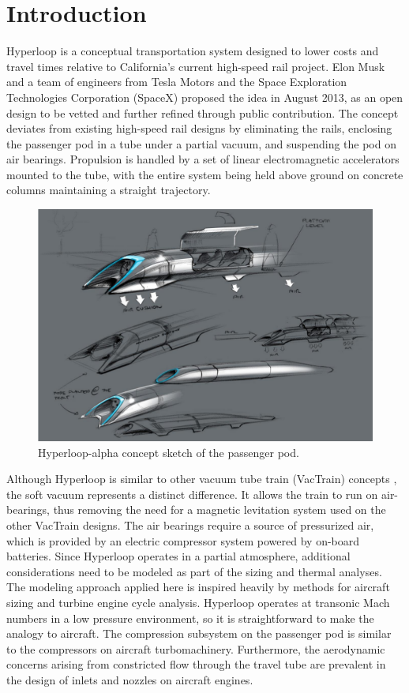 \documentclass[heading.tex]{subfiles}
\begin{document}
\section{Introduction}

Hyperloop is a conceptual transportation system designed to lower costs and travel times relative to California's current high-speed rail project.
\cite{Musk} Elon Musk and a team of engineers from Tesla Motors and the Space Exploration Technologies Corporation (SpaceX)
proposed the idea in August 2013, as an open design to be vetted and further refined through public contribution.
The concept deviates from existing high-speed rail designs by eliminating the rails, enclosing the passenger pod in a 
tube under a partial vacuum, and suspending the pod on air bearings. Propulsion is handled by a set of linear 
electromagnetic accelerators mounted to the tube, with the entire system being held above ground on concrete 
columns maintaining a straight trajectory.

\begin{figure}[hbtp]
\centering
\includegraphics[width=.75\textwidth]{images/hyperloopAlphaSketch.png}
 \caption[Hyperloop Concept Sketch]{Hyperloop-alpha concept sketch of the passenger pod. \cite{Musk}}
\label{f:hyperloopSketch}
\end{figure}

Although Hyperloop is similar to other vacuum tube train (VacTrain) concepts \cite{ET3}, the soft vacuum represents a distinct difference.
It allows the train to run on air-bearings, thus removing the need for a magnetic levitation system used on the other VacTrain designs.
The air bearings require a source of pressurized air, which is provided by an electric compressor system powered by on-board batteries.
Since Hyperloop operates in a partial atmosphere, additional considerations need to be modeled as part of the sizing and thermal analyses. 
The modeling approach applied here is inspired heavily by methods for aircraft sizing and turbine engine cycle analysis. Hyperloop 
operates at transonic Mach numbers in a low pressure environment, so it is straightforward to make the analogy to aircraft. 
The compression subsystem on the passenger pod is similar to the compressors on aircraft turbomachinery. Furthermore, the aerodynamic concerns  
arising from constricted flow through the travel tube are prevalent in the design of inlets and nozzles on aircraft engines. 
\end{document}

